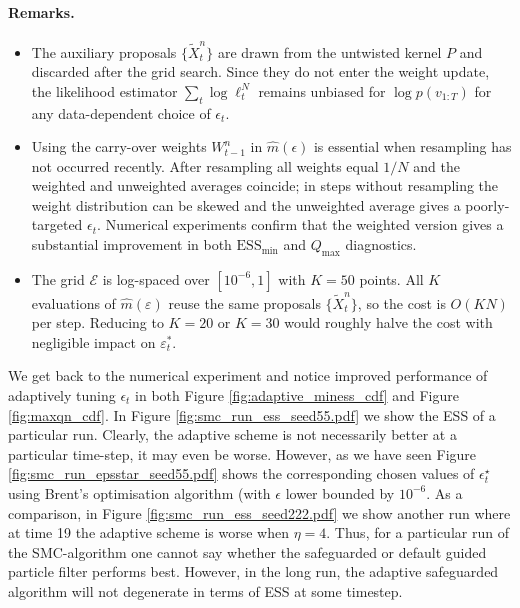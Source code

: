 \documentclass[11pt,reqno]{amsart}
\theoremstyle{definition}
\begin{document}
\paragraph{Remarks.}
\begin{itemize}
  \item The auxiliary proposals $\{\tilde{X}_t^n\}$ are drawn from the
    untwisted kernel $P$ and discarded after the grid search. Since they do
    not enter the weight update, the likelihood estimator
    $\sum_t \log\ell_t^N$ remains unbiased for $\log p(v_{1:T})$ for any
    data-dependent choice of $\epsilon_t$.

  \item Using the carry-over weights $W_{t-1}^n$ in $\hat{m}(\epsilon)$
    is essential when resampling has not occurred recently. After resampling
    all weights equal $1/N$ and the weighted and unweighted averages
    coincide; in steps without resampling the weight distribution can be
    skewed and the unweighted average gives a poorly-targeted
    $\epsilon_t$. Numerical experiments confirm that the weighted
    version gives a substantial improvement in both $\mathrm{ESS}_{\min}$ and
    $Q_{\max}$ diagnostics.

  \item The grid $\mathcal{E}$ is log-spaced over $[10^{-6}, 1]$ with $K=50$
    points. All $K$ evaluations of $\hat{m}(\varepsilon)$ reuse the same
    proposals $\{\tilde{X}_t^n\}$, so the cost is $O(KN)$ per step.
    Reducing to $K=20$ or $K=30$ would roughly halve the cost with
    negligible impact on $\varepsilon_t^*$.


\end{itemize}

We get back to the numerical experiment and notice improved performance of adaptively tuning $\epsilon_t$ in both Figure \ref{fig:adaptive_miness_cdf} and Figure \ref{fig:maxqn_cdf}.  
In Figure \ref{fig:smc_run_ess_seed55.pdf} we show the ESS of a particular run. Clearly, the adaptive scheme is not necessarily better at a particular time-step, it may even be worse. However, as we have seen
Figure \ref{fig:smc_run_epsstar_seed55.pdf} shows the corresponding chosen values of $\epsilon^\star_t$ using Brent's optimisation algorithm (with $\epsilon$ lower bounded by  $10^{-6}$. 
As a comparison, in Figure \ref{fig:smc_run_ess_seed222.pdf} we show another run where at  time 19 the adaptive scheme is worse when $\eta=4$. 
Thus, for a particular run of the SMC-algorithm one cannot say whether the safeguarded or default guided particle filter performs best. However, in the long run, the adaptive safeguarded algorithm will not degenerate in terms of ESS at some timestep. 
\end{document}
